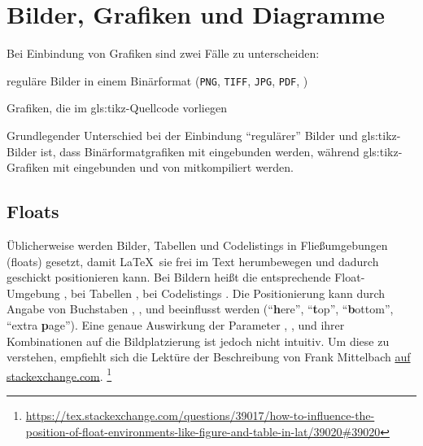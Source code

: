 \section[Bilder, Grafiken und Diagramme]{Bilder, Grafiken und Diagramme}
\label{sec:Bilder}
%
Bei Einbindung von Grafiken sind zwei Fälle zu unterscheiden:
\begin{itemize*}
  \item reguläre Bilder in einem Binärformat
	      (\texttt{PNG}, \texttt{TIFF}, \texttt{JPG}, \texttt{PDF}, \etc)
	\item {}Grafiken, die im \gls{gls:tikz}-Quellcode vorliegen 
\end{itemize*}

Grundlegender Unterschied bei der Einbindung \enquote{regulärer} Bilder
und \gls{gls:tikz}-Bilder ist, dass Binärformatgrafiken mit
 eingebunden werden,
während \gls{gls:tikz}-Grafiken mit 
eingebunden und von  mitkompiliert werden.


\subsection[Floats]{Floats}%
\label{sec:Floats}
%
Üblicherweise werden Bilder, Tabellen und Codelistings in Fließumgebungen (floats) gesetzt,
damit \LaTeX\ sie frei im Text herumbewegen und dadurch geschickt positionieren kann.
Bei Bildern heißt die entsprechende Float-Umgebung , 
bei Tabellen , bei Codelistings .
Die Positionierung kann durch Angabe von Buchstaben
, ,  und 
beeinflusst werden
(\enquote{\textbf{h}ere}, \enquote{\textbf{t}op}, \enquote{\textbf{b}ottom}, \enquote{extra \textbf{p}age}).
Eine genaue Auswirkung der Parameter
, ,  und 
\bzw ihrer Kombinationen auf die Bildplatzierung ist jedoch nicht intuitiv.
Um diese zu verstehen, empfiehlt sich die Lektüre der Beschreibung
von Frank Mittelbach
\href{https://tex.stackexchange.com/questions/39017/how-to-influence-the-position-of-float-environments-like-figure-and-table-in-lat/39020#39020}{auf stackexchange.com}.%
\footnote{\url{https://tex.stackexchange.com/questions/39017/how-to-influence-the-position-of-float-environments-like-figure-and-table-in-lat/39020#39020}}

